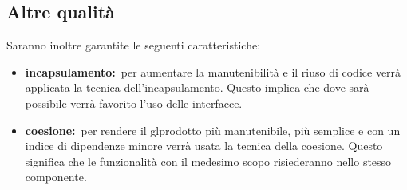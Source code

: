 \subsection{Altre qualità}
Saranno inoltre garantite le seguenti caratteristiche:
\begin{itemize}
\item \textbf{incapsulamento:}\ per aumentare la manutenibilità e il riuso di codice verrà applicata la tecnica dell'incapsulamento. Questo implica che dove sarà possibile verrà favorito l'uso delle interfacce.
\item \textbf{coesione:}\ per rendere il gl{prodotto} più manutenibile, più semplice e con un indice di dipendenze minore verrà usata la tecnica della coesione. Questo significa che le funzionalità con il medesimo scopo risiederanno nello stesso componente.
\end{itemize}